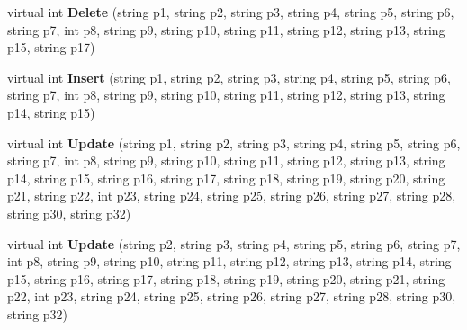 \begin{DoxyCompactItemize}
\item 
virtual int {\bfseries Delete} (string p1, string p2, string p3, string p4, string p5, string p6, string p7, int p8, string p9, string p10, string p11, string p12, string p13, string p15, string p17)\hypertarget{class_products_1_1_data_1_1ds_sage_table_adapters_1_1ta_user_a06ac5d63de97f32a2e0023200be65ba4}{}\label{class_products_1_1_data_1_1ds_sage_table_adapters_1_1ta_user_a06ac5d63de97f32a2e0023200be65ba4}

\item 
virtual int {\bfseries Insert} (string p1, string p2, string p3, string p4, string p5, string p6, string p7, int p8, string p9, string p10, string p11, string p12, string p13, string p14, string p15)\hypertarget{class_products_1_1_data_1_1ds_sage_table_adapters_1_1ta_user_a88365496e48540665ba802fd5a83eef3}{}\label{class_products_1_1_data_1_1ds_sage_table_adapters_1_1ta_user_a88365496e48540665ba802fd5a83eef3}

\item 
virtual int {\bfseries Update} (string p1, string p2, string p3, string p4, string p5, string p6, string p7, int p8, string p9, string p10, string p11, string p12, string p13, string p14, string p15, string p16, string p17, string p18, string p19, string p20, string p21, string p22, int p23, string p24, string p25, string p26, string p27, string p28, string p30, string p32)\hypertarget{class_products_1_1_data_1_1ds_sage_table_adapters_1_1ta_user_a669674e7c51bdf294664609d25443608}{}\label{class_products_1_1_data_1_1ds_sage_table_adapters_1_1ta_user_a669674e7c51bdf294664609d25443608}

\item 
virtual int {\bfseries Update} (string p2, string p3, string p4, string p5, string p6, string p7, int p8, string p9, string p10, string p11, string p12, string p13, string p14, string p15, string p16, string p17, string p18, string p19, string p20, string p21, string p22, int p23, string p24, string p25, string p26, string p27, string p28, string p30, string p32)\hypertarget{class_products_1_1_data_1_1ds_sage_table_adapters_1_1ta_user_a789e925bcabca62ab01231405da64606}{}\label{class_products_1_1_data_1_1ds_sage_table_adapters_1_1ta_user_a789e925bcabca62ab01231405da64606}

\end{DoxyCompactItemize}
